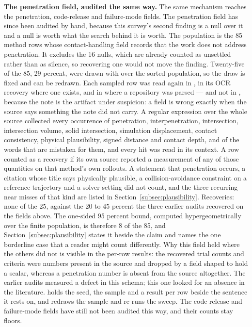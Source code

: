 \textbf{The penetration field, audited the same way.} The same mechanism reaches the penetration,
code-release and failure-mode fields. The penetration field has since been audited by hand, because
this survey's second finding is a null over it and a null is worth what the search behind it is
worth. The population is the 85 method rows whose contact-handling field records that the work does
not address penetration. It excludes the 16 nulls, which are already counted as unsettled rather
than as silence, so recovering one would not move the finding. Twenty-five of the 85, 29 percent,
were drawn with  over the sorted population, so the draw is
fixed and can be redrawn. Each sampled row was read again in , in its OCR recovery
where one exists, and in  where a repository was parsed --- and not in
, because the note is the artifact under suspicion: a field is wrong exactly
when the source says something the note did not carry. A regular expression over the whole source
collected every occurrence of penetration, interpenetration, intersection, intersection volume,
solid intersection, simulation displacement, contact consistency, physical plausibility, signed
distance and contact depth, and of the words that are mistaken for them, and every hit was read in
its context. A row counted as a recovery if its own source reported a measurement of any of those
quantities on that method's own rollouts. A statement that penetration occurs, a citation whose
title says physically plausible, a collision-avoidance constraint on a reference trajectory and a
solver setting did not count, and the three recurring near misses of that kind are listed in
Section~\ref{subsec:plausibility}. Recoveries: none of the 25, against the 20 to 45 percent the
three earlier audits recovered on the fields above. The one-sided 95 percent bound, computed
hypergeometrically over the finite population, is therefore 8 of the 85, and
Section~\ref{subsec:plausibility} states it beside the claim and names the one borderline case that
a reader might count differently. Why this field held where the others did not is visible in the
per-row results: the recovered trial counts and criteria were numbers present in the source and dropped by
a field shaped to hold a scalar, whereas a penetration number is absent from the source altogether.
The earlier audits measured a defect in this schema; this one looked for an absence in the
literature.  holds the seed, the sample and a result per row
beside the sentence it rests on, and  redraws the sample and
re-runs the sweep. The code-release and failure-mode fields have still not been audited this way,
and their counts stay floors.

